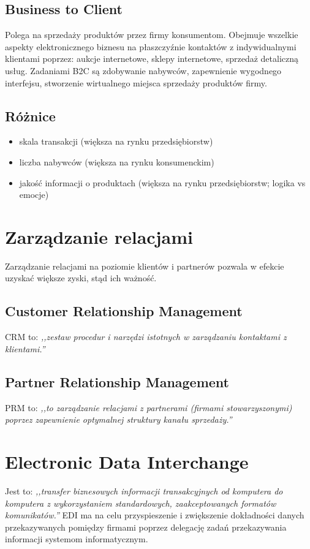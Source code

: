 \documentclass{report}
\begin{document}
\subsection{Business to Client}
Polega na sprzedaży produktów przez firmy konsumentom. Obejmuje wszelkie aspekty elektronicznego biznesu na płaszczyźnie kontaktów z indywidualnymi klientami poprzez: aukcje internetowe, sklepy internetowe, sprzedaż detaliczną usług. Zadaniami B2C są zdobywanie nabywców, zapewnienie wygodnego interfejsu, stworzenie wirtualnego miejsca sprzedaży produktów firmy.
\subsection{Różnice}
\begin{itemize}
\item skala transakcji (większa na rynku przedsiębiorstw)
\item liczba nabywców (większa na rynku konsumenckim)
\item jakość informacji o produktach (większa na rynku przedsiębiorstw; logika vs emocje)
\end{itemize}
\section{Zarządzanie relacjami}
Zarządzanie relacjami na poziomie klientów i partnerów pozwala w efekcie uzyskać większe zyski, stąd ich ważność.
\subsection{Customer Relationship Management}
CRM to: \emph{,,zestaw procedur i narzędzi istotnych w zarządzaniu kontaktami z klientami.''}\cite{wiki:crm}
\subsection{Partner Relationship Management}
PRM to: \emph{,,to zarządzanie relacjami z partnerami (firmami stowarzyszonymi) poprzez zapewnienie optymalnej struktury kanału sprzedaży.''}\cite{wiki:prm}
\section{Electronic Data Interchange}
Jest to: \emph{,,transfer biznesowych informacji transakcyjnych od komputera do komputera z wykorzystaniem standardowych, zaakceptowanych formatów komunikatów.''}\cite{wiki:edi} EDI ma na celu przyspieszenie i zwiększenie dokładności danych przekazywanych pomiędzy firmami poprzez delegację zadań przekazywania informacji systemom informatycznym.
{}

\end{document}
